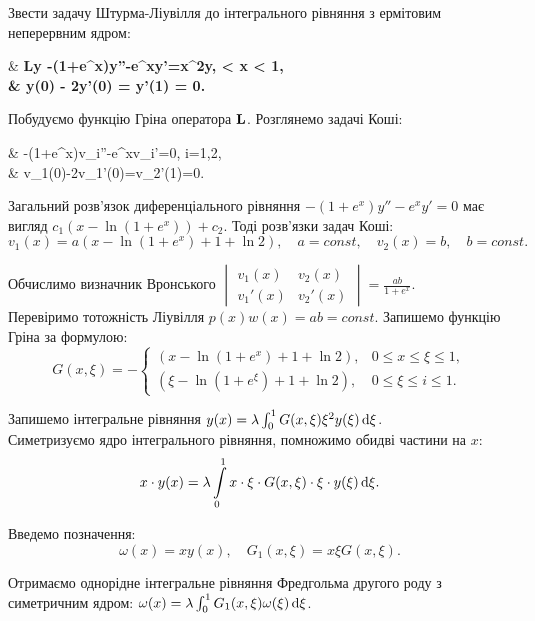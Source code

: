 \begin{example}
	Звести задачу Штурма-Ліувілля до інтегрального рівняння з ермітовим неперервним ядром:
	\begin{system*}
		& \bf{L}y \equiv -(1+e^x)y''-e^xy'=\lambda x^2y,  < x < 1, \\
		& y(0) - 2y'(0) = y'(1) = 0.
	\end{system*}
\end{example}

\begin{solution*}
	Побудуємо функцію Гріна оператора $\bf{L}$. Розглянемо задачі Коші:
	\begin{system*}
		& -(1+e^x)v_i''-e^xv_i'=0, \quad i=1,2,\\
		& v_1(0)-2v_1'(0)=v_2'(1)=0.
	\end{system*}

	Загальний розв’язок диференціального рівняння $-(1+e^x)y''-e^xy'=0$ має вигляд $c_1(x-\ln(1+e^x))+c_2$. Тоді розв’язки задач Коші:
	\[ v_1(x) = a(x - \ln(1+e^x)+1+\ln2), \quad a = const, \quad v_2(x) = b, \quad b = const. \]

	Обчислимо визначник Вронського $\begin{vmatrix} v_1(x) & v_2(x) \\ v_1'(x) & v_2'(x) \end{vmatrix} = \frac{ab}{1+e^x}$. \\

	Перевіримо тотожність Ліувілля $p(x)w(x) = ab = const$. Запишемо функцію Гріна за формулою:
	\[ G(x, \xi) = - \begin{cases} (x-\ln(1+e^x)+1+\ln2), & 0\le x \le \xi \le 1, \\ (\xi-\ln(1+e^\xi)+1+\ln2), & 0\le \xi \le i \le 1. \end{cases} \]

	Запишемо інтегральне рівняння $y(x) = \lambda \int_0^1 G(x,\xi)\xi^2y(\xi)\diff\xi$. \\

	Симетризуємо ядро інтегрального рівняння, помножимо обидві частини на $x$: \[ x \cdot y(x) = \lambda \Int_0^1 x \cdot \xi \cdot G(x, \xi) \cdot \xi \cdot y(\xi) \diff \xi. \]

	Введемо позначення: \[ \omega(x) = xy(x), \quad G_1(x, \xi) = x\xi G(x,\xi).\]

	Отримаємо однорідне інтегральне рівняння Фредгольма другого роду з симетричним ядром: $\omega(x) = \lambda \int_0^1 G_1(x, \xi) \omega(\xi) \diff \xi$.
\end{solution*}

